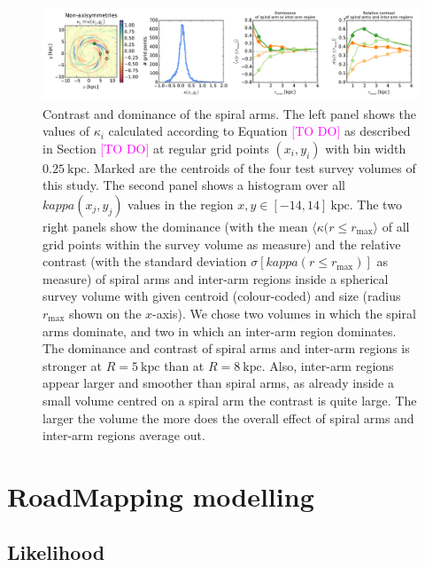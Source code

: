 \documentclass[iop,revtex4,numberedappendix,appendixfloats]{emulateapj}
\newcommand{\Wilma}[1]{\textcolor{Magenta}{#1}}
\begin{document}
\begin{figure}[!htbp]
\includegraphics[width=\textwidth]{fig/whole_galaxy_kappa_i.pdf}
\caption{Contrast and dominance of the spiral arms. The left panel shows the values of $\kappa_i$ calculated according to Equation \Wilma{[TO DO]} as described in Section \Wilma{[TO DO]} at regular grid points $(x_i,y_i)$ with bin width $0.25~\text{kpc}$. Marked are the centroids of the four test survey volumes of this study. The second panel shows a histogram over all $kappa(x_j,y_j)$ values in the region $x,y \in [-14,14]~\text{kpc}$. The two right panels show the dominance (with the mean $\langle \kappa (r \leq r_\text{max} \rangle$ of all grid points within the survey volume as measure) and the relative contrast (with the standard deviation $\sigma[kappa (r \leq r_\text{max})]$ as measure) of spiral arms and inter-arm regions inside a spherical survey volume with given centroid (colour-coded) and size (radius $r_\text{max}$ shown on the $x$-axis). We chose two volumes in which the spiral arms dominate, and two in which an inter-arm region dominates. The dominance and contrast of spiral arms and inter-arm regions is stronger at $R=5~\text{kpc}$ than at $R=8~\text{kpc}$. Also, inter-arm regions appear larger and smoother than spiral arms, as already inside a small volume centred on a spiral arm the contrast is quite large. The larger the volume the more does the overall effect of spiral arms and inter-arm regions average out.}
\label{fig:???}
\end{figure}


\section{RoadMapping modelling}

\subsection{Likelihood} \label{sec:likelihood}
\end{document}
